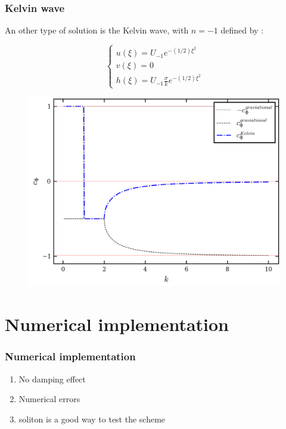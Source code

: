 \documentclass[numbering=fraction]{beamer}
\begin{document}
\begin{frame}
    \frametitle{Kelvin wave}
    An other type of solution is the Kelvin wave, with $n = -1$ defined by :

    \begin{minipage}{.38\linewidth}
        \begin{equation}
            \begin{cases}
                u(\xi) = U_{-1}e^{-(1/2)\xi^2} \\
                v(\xi) = 0                     \\
                h(\xi) = U_{-1}\frac{\sigma}{k}e^{-(1/2)\xi^2}
            \end{cases}
        \end{equation}
    \end{minipage}
    \hfill
    \begin{minipage}{0.6\linewidth}
        \begin{figure}[H]
            \includegraphics[width=1\linewidth]{./figure/roots_k2.png}
            \label{fig: Kelvin mode}
        \end{figure}
    \end{minipage}
\end{frame}


\section{Numerical implementation}
\begin{frame}
    \frametitle{Numerical implementation}
    \begin{enumerate}
        \item No damping effect
        \item Numerical errors
        \item soliton is a good way to test the scheme
    \end{enumerate}
\end{frame}
\end{document}
